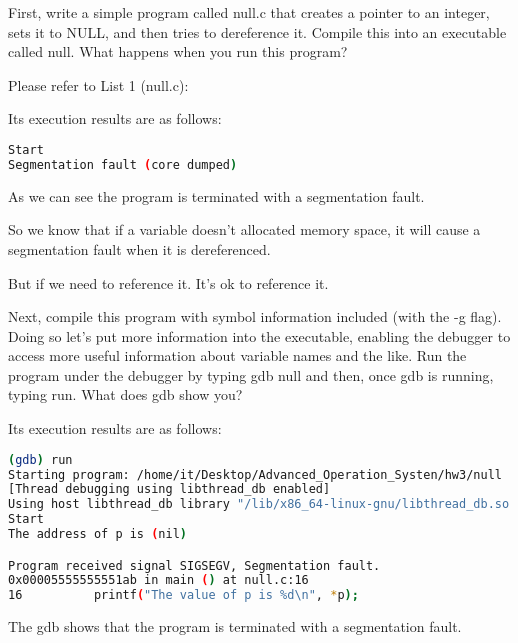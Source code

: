 \documentclass[10pt, answers]{exam}
\begin{document}

\begin{questions} 
\setcounter{question}{0} 

\question 
First, write a simple program called null.c that creates a pointer
to an integer, sets it to NULL, and then tries to dereference it.
Compile this into an executable called null. What happens when you
run this program?

\begin{solution}
Please refer to List 1 (null.c):



Its execution results are as follows:

\begin{lstlisting}[language=bash]
Start
Segmentation fault (core dumped)
\end{lstlisting}

As we can see the program is terminated with a segmentation fault.

So we know that if a variable doesn't allocated memory space,
it will cause a segmentation fault when it is dereferenced.

But if we need to reference it.
It's ok to reference it.
\end{solution}



\end{questions}

\begin{questions} 
\setcounter{question}{1} 
\question 
Next, compile this program with symbol information included (with
the -g flag). Doing so let’s put more information into the executable,
enabling the debugger to access more useful information about variable 
names and the like. Run the program under the debugger by typing gdb null 
and then, once gdb is running, typing run. What does gdb show you?

\begin{solution}
    
Its execution results are as follows:
\begin{lstlisting}[language=bash]
(gdb) run
Starting program: /home/it/Desktop/Advanced_Operation_Systen/hw3/null 
[Thread debugging using libthread_db enabled]
Using host libthread_db library "/lib/x86_64-linux-gnu/libthread_db.so.1".
Start
The address of p is (nil)

Program received signal SIGSEGV, Segmentation fault.
0x00005555555551ab in main () at null.c:16
16          printf("The value of p is %d\n", *p);
\end{lstlisting}
The gdb shows that the program is terminated with a segmentation fault.

\end{solution}
\end{questions}
\end{document}
